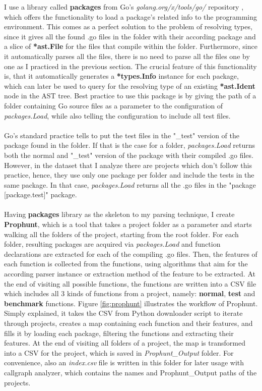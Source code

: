 \documentclass{seal_thesis}
\begin{document}
I use a library called \textbf{packages} from Go's \textit{golang.org/x/tools/go/} repository  \cite{packages}, which offers the functionality to load a package's related info to the programming environment. This comes as a perfect solution to the problem of resolving types, since it gives all the found .go files in the folder with their according package and a slice of \textbf{*ast.File} for the files that compile within the folder. Furthermore, since it automatically parses all the files, there is no need to parse all the files one by one as I practiced in the previous section. The crucial feature of this functionality is, that it automatically generates a \textbf{*types.Info} instance for each package, which can later be used to query for the resolving type of an existing \textbf{*ast.Ident} node in the AST tree. Best practice to use this package is by giving the path of a folder containing Go source files as a parameter to the configuration of \textit{packages.Load}, while also telling the configuration to include all test files.\\
\\
Go's standard practice tells to put the test files in the "\_test" version of the package found in the folder. If that is the case for a folder, \textit{packages.Load} returns both the normal and "\_test" version of the package with their compiled .go files. However, in the dataset that I analyze there are projects which don't follow this practice, hence, they use only one package per folder and include the tests in the same package. In that case, \textit{packages.Load} returns all the .go files in the "package [package.test]" package.\\
\\
Having \textbf{packages} library as the skeleton to my parsing technique, I create \textbf{Prophunt}, which is a tool that takes a project folder as a parameter and starts walking all the folders of the project, starting from the root folder. For each folder, resulting packages are acquired via \textit{packages.Load} and function declarations are extracted for each of the compiling .go files. Then, the features of each function is collected from the functions, using algorithms that aim for the according parser instance or extraction method of the feature to be extracted. At the end of visiting all possible functions, the functions are written into a CSV file which includes all 3 kinds of functions from a project, namely: \textbf{normal}, \textbf{test} and \textbf{benchmark} functions. Figure \ref{fig:prophunt} illustrates the workflow of Prophunt. Simply explained, it takes the CSV from Python downloader script to iterate through projects, creates a map containing each function and their features, and fills it by loading each package, filtering the functions and extracting their features. At the end of visiting all folders of a project, the map is transformed into a CSV for the project, which is saved in \textit{Prophunt\_Output} folder. For convenience, also an \textit{index.csv} file is written in this folder for later usage with callgraph analyzer, which contains the names and Prophunt\_Output paths of the projects.
\end{document}
